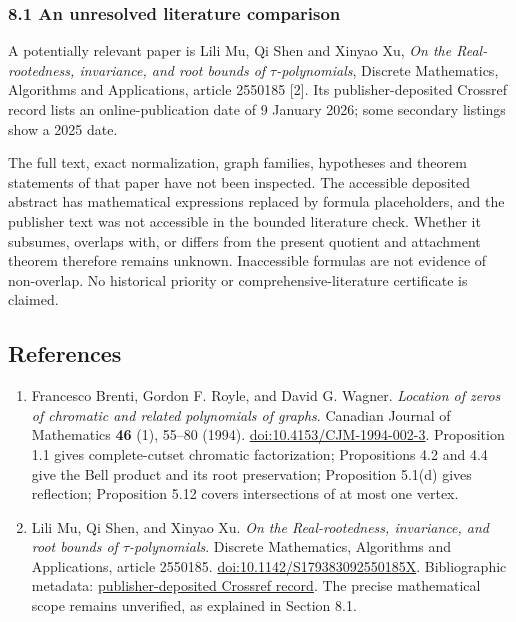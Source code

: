 \documentclass[
  11pt,
  a4paper,
]{article}
\begin{document}
\subsubsection{8.1 An unresolved literature
comparison}\label{an-unresolved-literature-comparison}

A potentially relevant paper is Lili Mu, Qi Shen and Xinyao Xu, \emph{On
the Real-rootedness, invariance, and root bounds of
\(\tau\)-polynomials}, Discrete Mathematics, Algorithms and
Applications, article 2550185 {[}2{]}. Its publisher-deposited Crossref
record lists an online-publication date of 9 January 2026; some
secondary listings show a 2025 date.

\begin{samepage}
The full text, exact normalization, graph families, hypotheses and
theorem statements of that paper have not been inspected. The accessible
deposited abstract has mathematical expressions replaced by formula
placeholders, and the publisher text was not accessible in the bounded
literature check. Whether it subsumes, overlaps with, or differs from
the present quotient and attachment theorem therefore remains unknown.
Inaccessible formulas are not evidence of non-overlap. No historical
priority or comprehensive-literature certificate is claimed.

\end{samepage}

\subsection{References}\label{references}

\begin{enumerate}
\def\labelenumi{\arabic{enumi}.}
\item
  Francesco Brenti, Gordon F. Royle, and David G. Wagner. \emph{Location
  of zeros of chromatic and related polynomials of graphs}. Canadian
  Journal of Mathematics \textbf{46} (1), 55--80 (1994).
  \href{https://doi.org/10.4153/CJM-1994-002-3}{doi:10.4153/CJM-1994-002-3}.
  Proposition 1.1 gives complete-cutset chromatic factorization;
  Propositions 4.2 and 4.4 give the Bell product and its root
  preservation; Proposition 5.1(d) gives reflection; Proposition 5.12
  covers intersections of at most one vertex.
\item
  Lili Mu, Qi Shen, and Xinyao Xu. \emph{On the Real-rootedness,
  invariance, and root bounds of \(\tau\)-polynomials}. Discrete
  Mathematics, Algorithms and Applications, article 2550185.
  \href{https://doi.org/10.1142/S179383092550185X}{doi:10.1142/S179383092550185X}.
  Bibliographic metadata:
  \href{https://api.crossref.org/works/10.1142/S179383092550185X}{publisher-deposited
  Crossref record}. The precise mathematical scope remains unverified,
  as explained in Section 8.1.
\end{enumerate}
\end{document}
